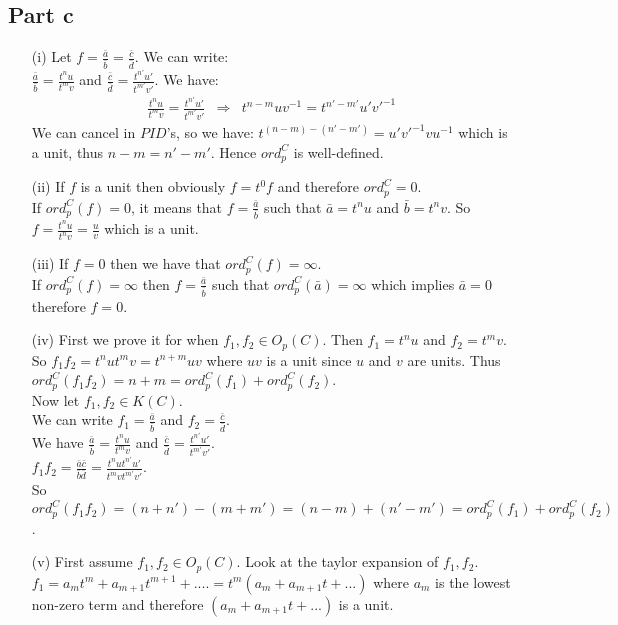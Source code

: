 \documentclass[12pt]{article}
\begin{document}
\clearpage
\subsection*{Part c}
\begin{enumerate}
\item[(i)]
Let $f = \frac{\bar{a}}{\bar{b}}=\frac{\bar{c}}{\bar{d}}$. We can write: \\
$\frac{\bar{a}}{\bar{b}}=\frac{t^nu}{t^mv}$ and $\frac{\bar{c}}{\bar{d}}=\frac{t^{n'}u'}{t^{m'}v'}$. We have: \\
\begin{eqnarray*}
\frac{t^nu}{t^mv}=\frac{t^{n'}u'}{t^{m'}v'} &\Rightarrow &
t^{n-m}uv^{-1}=t^{n'-m'}u'v'^{-1}
\end{eqnarray*}
We can cancel in $PID$'s, so we have:
$t^{(n-m)-(n'-m')}=u'v'^{-1}vu^{-1}$ which is a unit, thus $n-m=n'-m'$. Hence $ord_p^C$ is well-defined.
\item[(ii)] If $f$ is a unit then obviously $f=t^0f$ and therefore $ord_p^C=0$. \\
If $ord_p^C(f)=0$, it means that $f=\frac{\bar{a}}{\bar{b}}$ such that $\bar{a}=t^nu$ and $\bar{b}=t^nv$. So $f=\frac{t^nu}{t^nv}=\frac{u}{v}$ which is a unit.
\item[(iii)]
If $f=0$ then we have that $ord_p^C(f)=\infty$. \\
If $ord_p^C(f)=\infty$ then $f=\frac{\bar{a}}{\bar{b}}$ such that
$ord_p^C(\bar{a})=\infty$ which implies $\bar{a}=0$ therefore $f=0$.
\item[(iv)] 
First we prove it for when $f_1,f_2 \in O_p(C)$. Then $f_1=t^nu$ and $f_2=t^mv$. \\
So $f_1f_2=t^nut^mv=t^{n+m}uv$ where $uv$ is a unit since $u$ and $v$ are units. Thus
$ord_p^C(f_1f_2)=n+m=ord_p^C(f_1)+ord_p^C(f_2)$. \\
Now let $f_1,f_2 \in K(C)$. \\
We can write $f_1=\frac{\bar{a}}{\bar{b}}$ and $f_2=\frac{\bar{c}}{\bar{d}}$. \\
We have $\frac{\bar{a}}{\bar{b}}=\frac{t^nu}{t^mv}$ and
$\frac{\bar{c}}{\bar{d}}=\frac{t^{n'}u'}{t^{m'}v'}$. \\
$f_1f_2=\frac{\bar{a}\bar{c}}{\bar{b}\bar{d}}=\frac{t^nu{t^{n'}u'}}{t^mvt^{m'}v'}$. \\
So $ord_p^C(f_1f_2)=(n+n')-(m+m')=(n-m)+(n'-m')=ord_p^C(f_1)+ord_p^C(f_2)$.
\item[(v)]
First assume $f_1,f_2 \in O_p(C)$. Look at the taylor expansion of $f_1,f_2$. \\
$f_1=a_mt^m+a_{m+1}t^{m+1}+....=t^m(a_m+a_{m+1}t+...)$ where $a_m$ is the lowest non-zero term and therefore $(a_m+a_{m+1}t+...)$ is a unit. \\

\end{enumerate}
\end{document}
